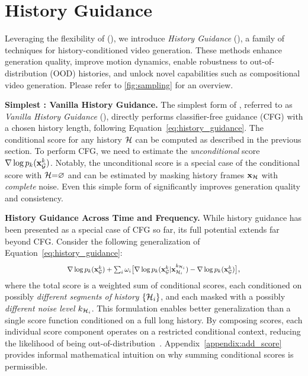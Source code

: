 

\section{History Guidance}
\label{sec:our_history_guidance}

Leveraging the flexibility of \method (\mtd), we introduce \emph{History Guidance} (\HG), a family of techniques for history-conditioned video generation. These methods enhance generation quality, improve motion dynamics, enable robustness to out-of-distribution (OOD) histories, and unlock novel capabilities such as compositional video generation. Please refer to \cref{fig:sampling} for an overview.

\textbf{Simplest \HG: Vanilla History Guidance.} The simplest form of \HG, referred to as \emph{Vanilla History Guidance} (\HGv), directly performs classifier-free guidance (CFG) with a chosen history length, following Equation~\ref{eq:history_guidance}. The conditional score for any history ${\mathcal{H}}$ can be computed as described in the previous section. To perform CFG, we need to estimate the \emph{unconditional} score ${\nabla \log\,} p_k({\mathbf{x}_{\mathcal{G}}^{k}})$. Notably, the unconditional score is a special case of the conditional score with ${\mathcal{H}} \mkern-5mu = \mkern-5mu \varnothing$ and can be estimated by masking history frames ${\mathbf{x}_{\mathcal{H}}}$ with \emph{complete} noise. Even this simple form of \HG significantly improves generation quality and consistency.

\textbf{History Guidance Across Time and Frequency.} While history guidance has been presented as a special case of CFG so far, its full potential extends far beyond CFG.
Consider the following generalization of Equation~\ref{eq:history_guidance}:
\vspace{-5pt}
\begin{equation}
\scalebox{0.85}{$
\score p_k(\xGk) + \sum_i \omega_i \big[\score p_k(\xGk|\bx_{\cH_i}^{k_{\cH_i}}) - \score p_k(\xGk)\big]
$},
\label{eq:history_guidance_across_tf}
\vspace{-5pt}
\end{equation}
where the total score is a weighted sum of conditional scores, each conditioned on possibly \emph{different segments of history} $\{{\mathcal{H}}_i\}$, and each masked with a possibly \emph{different noise level} $k_{{\mathcal{H}}_i}$. This formulation enables better generalization than a single score function conditioned on a full long history. By composing scores, each individual score component operates on a restricted conditional context, reducing the likelihood of being out-of-distribution~\cite{du2024compositional}. Appendix~\ref{appendix:add_score} provides informal mathematical intuition on why summing conditional scores is permissible.

